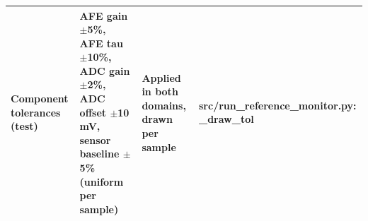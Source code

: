 \begin{table}[H]
\begin{tabular}{p{3.2cm}p{3.6cm}p{3.6cm}p{3.6cm}}
Component tolerances (test) & AFE gain $\pm$5\%, AFE tau $\pm$10\%, ADC gain $\pm$2\%, ADC offset $\pm$10 mV, sensor baseline $\pm$5\% (uniform per sample) & Applied in both domains, drawn per sample & src/run\_reference\_monitor.py: \_draw\_tol \\
\bottomrule
\end{tabular}
\par\vspace{2pt}
\end{table}
